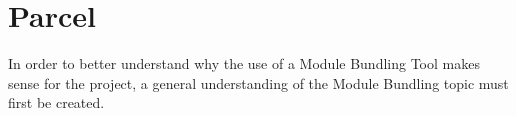 \section{Parcel}
\label{sec:tecParcel}
%
% 
In order to better understand why the use of a Module Bundling Tool makes sense for the project, a general understanding of the Module Bundling topic must first be created.

